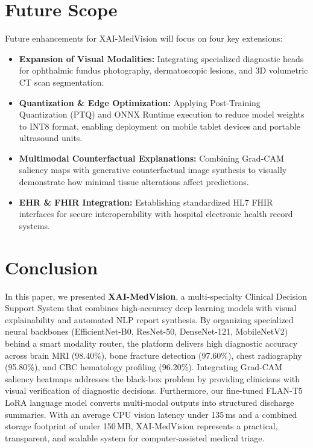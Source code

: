 \documentclass[conference]{IEEEtran}
\begin{document}
\section{Future Scope}
Future enhancements for XAI-MedVision will focus on four key extensions:
\begin{itemize}
    \item \textbf{Expansion of Visual Modalities:} Integrating specialized diagnostic heads for ophthalmic fundus photography, dermatoscopic lesions, and 3D volumetric CT scan segmentation.
    \item \textbf{Quantization & Edge Optimization:} Applying Post-Training Quantization (PTQ) and ONNX Runtime execution to reduce model weights to INT8 format, enabling deployment on mobile tablet devices and portable ultrasound units.
    \item \textbf{Multimodal Counterfactual Explanations:} Combining Grad-CAM saliency maps with generative counterfactual image synthesis to visually demonstrate how minimal tissue alterations affect predictions.
    \item \textbf{EHR & FHIR Integration:} Establishing standardized HL7 FHIR interfaces for secure interoperability with hospital electronic health record systems.
\end{itemize}

\section{Conclusion}
In this paper, we presented \textbf{XAI-MedVision}, a multi-specialty Clinical Decision Support System that combines high-accuracy deep learning models with visual explainability and automated NLP report synthesis. By organizing specialized neural backbones (EfficientNet-B0, ResNet-50, DenseNet-121, MobileNetV2) behind a smart modality router, the platform delivers high diagnostic accuracy across brain MRI (98.40\%), bone fracture detection (97.60\%), chest radiography (95.80\%), and CBC hematology profiling (96.20\%). Integrating Grad-CAM saliency heatmaps addresses the black-box problem by providing clinicians with visual verification of diagnostic decisions. Furthermore, our fine-tuned FLAN-T5 LoRA language model converts multi-modal outputs into structured discharge summaries. With an average CPU vision latency under 135\,ms and a combined storage footprint of under 150\,MB, XAI-MedVision represents a practical, transparent, and scalable system for computer-assisted medical triage.
\end{document}
